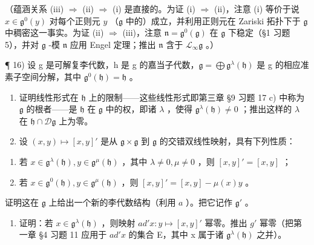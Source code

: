 （蕴涵关系 (iii) \(\Longrightarrow\) (ii) \(\Longrightarrow\) (i) 是直接的。为证 (i) \(\Longrightarrow\) (ii)，注意 (i) 等价于说 \(x\in \mathfrak{g}^0 (y)\) 对每个正则元 \(y\) （\(\mathfrak{g}\) 中的）成立，并利用正则元在 Zariski 拓扑下于 \(\mathfrak{g}\) 中稠密这一事实。为证 (ii) \(\Longrightarrow\) (iii)，注意 \(\mathfrak{n} = \mathfrak{g}^0 (\mathfrak{g})\) 在 \(\mathfrak{g}\) 下稳定（§1 习题 5），并对 \(\mathfrak{g}\) -模 \(\mathfrak{n}\) 应用 Engel 定理；推出 \(\mathfrak{n}\) 含于 \(\mathcal{L}_{\infty}\mathfrak{g}\) 。）

¶ 16) 设 g 是可解复李代数，h 是 g 的嘉当子代数，\(\mathfrak{g} = \bigoplus \mathfrak{g}^{\lambda}(\mathfrak{h})\) 是 g 的相应准素子空间分解，其中 \(\mathfrak{g}^{0}(\mathfrak{h}) = \mathfrak{h}\) 。

\begin{enumerate}
\def\labelenumi{\alph{enumi})}
\item
  证明线性形式在 \(\mathfrak{h}\) 上的限制——这些线性形式即第三章 §9 习题 17 c) 中称为 \(\mathfrak{g}\) 的根者——是 \(\mathfrak{h}\) 在 \(\mathfrak{g}\) 中的权，即诸 \(\lambda\) ，使得 \(\mathfrak{g}^{\lambda}(\mathfrak{h}) \neq 0\) ；推出这样的 \(\lambda\) 在 \(\mathfrak{h} \cap \mathcal{D}\mathfrak{g}\) 上为零。
\item
  设 \((x,y)\mapsto [x,y]'\) 是从 \(\mathfrak{g}\times \mathfrak{g}\) 到 \(\mathfrak{g}\) 的交错双线性映射，具有下列性质：
\end{enumerate}

\begin{enumerate}
\def\labelenumi{(\roman{enumi})}
\item
  若 \(x \in \mathfrak{g}^{\lambda}(\mathfrak{h}), y \in \mathfrak{g}^{\mu}(\mathfrak{h})\) ，其中 \(\lambda \neq 0, \mu \neq 0\) ，则 \([x, y]' = [x, y]\) ；
\item
  若 \(x \in \mathfrak{g}^{0}(\mathfrak{h}), y \in \mathfrak{g}^{\mu}(\mathfrak{h})\) ，则 \([x, y]' = [x, y] - \mu(x)y\) 。
\end{enumerate}

证明这在 \(\mathfrak{g}\) 上给出一个新的李代数结构（利用 \(a\) ）。把它记作 \(\mathfrak{g}'\) 。

\begin{enumerate}
\def\labelenumi{\alph{enumi})}
\setcounter{enumi}{2}
\tightlist
\item
  证明：若 \(x \in \mathfrak{g}^{\lambda}(\mathfrak{h})\) ，则映射 \(ad'x : y \mapsto [x, y]'\) 幂零。推出 \(g'\) 幂零（把第一章 §4 习题 11 应用于 \(ad'x\) 的集合 E，其中 x 属于诸 \(\mathfrak{g}^{\lambda}(\mathfrak{h})\) 之并）。
\end{enumerate}

